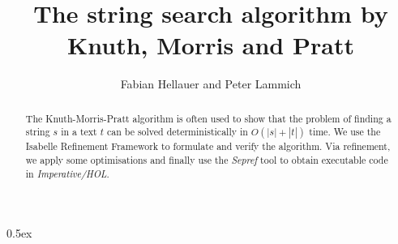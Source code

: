 \documentclass[11pt,a4paper]{article}
\begin{document}
\title{The string search algorithm by Knuth, Morris and Pratt}
\author{Fabian Hellauer and Peter Lammich}
\maketitle

\begin{abstract}
The Knuth-Morris-Pratt algorithm\cite{KMP77} is often used to show that the problem of finding 
a string $s$ in a text $t$ can be solved deterministically in $O(|s| + |t|)$ time. 
We use the Isabelle Refinement Framework\cite{Refine_Monadic-AFP} to formulate and verify 
the algorithm. Via refinement, we apply some optimisations and finally
use the \textit{Sepref} tool\cite{Refine_Imperative_HOL-AFP} to obtain executable 
code in \textit{Imperative/HOL}.
\end{abstract}

\tableofcontents
\clearpage

\parindent 0pt\parskip 0.5ex





\end{document}
